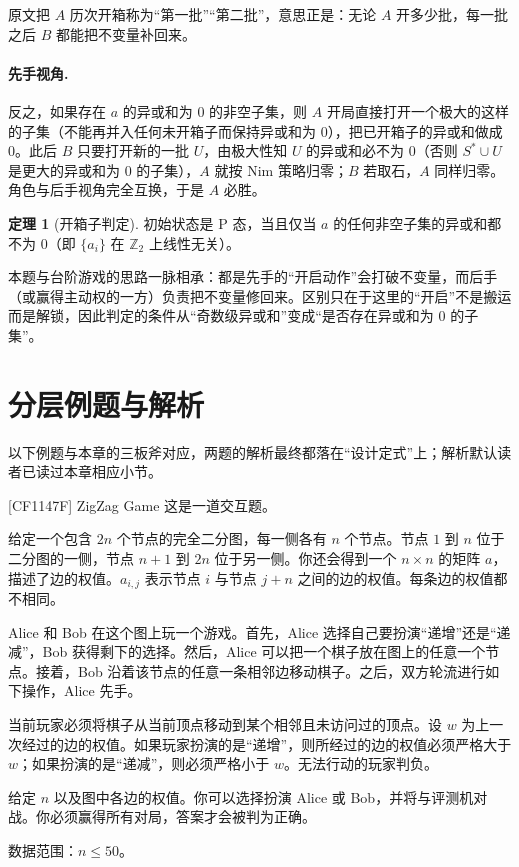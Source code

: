 \documentclass[UTF8,a4paper,11pt,oneside,openany,fontset=fandol]{ctexbook}
\theoremstyle{definition}
\newtheorem{theorem}[definition]{定理}
\newcommand{\Z}{\mathbb Z}
\begin{document}
原文把 $A$ 历次开箱称为“第一批”“第二批”，意思正是：无论 $A$ 开多少批，每一批之后 $B$ 都能把不变量补回来。

\paragraph{先手视角.} 反之，如果存在 $a$ 的异或和为 $0$ 的非空子集，则 $A$ 开局直接打开一个极大的这样的子集（不能再并入任何未开箱子而保持异或和为 $0$），把已开箱子的异或和做成 $0$。此后 $B$ 只要打开新的一批 $U$，由极大性知 $U$ 的异或和必不为 $0$（否则 $S^*\cup U$ 是更大的异或和为 $0$ 的子集），$A$ 就按 Nim 策略归零；$B$ 若取石，$A$ 同样归零。角色与后手视角完全互换，于是 $A$ 必胜。

\begin{theorem}[开箱子判定]\label{thm:boxnim}
初始状态是 P 态，当且仅当 $a$ 的任何非空子集的异或和都不为 $0$（即 $\{a_i\}$ 在 $\Z_2$ 上线性无关）。
\end{theorem}

本题与台阶游戏的思路一脉相承：都是先手的“开启动作”会打破不变量，而后手（或赢得主动权的一方）负责把不变量修回来。区别只在于这里的“开启”不是搬运而是解锁，因此判定的条件从“奇数级异或和”变成“是否存在异或和为 $0$ 的子集”。

\section{分层例题与解析}

以下例题与本章的三板斧对应，两题的解析最终都落在“设计定式”上；解析默认读者已读过本章相应小节。

\begin{problem}{[CF1147F] ZigZag Game}
这是一道交互题。

给定一个包含 $2n$ 个节点的完全二分图，每一侧各有 $n$ 个节点。节点 $1$ 到 $n$ 位于二分图的一侧，节点 $n+1$ 到 $2n$ 位于另一侧。你还会得到一个 $n\times n$ 的矩阵 $a$，描述了边的权值。$a_{i,j}$ 表示节点 $i$ 与节点 $j+n$ 之间的边的权值。每条边的权值都不相同。

Alice 和 Bob 在这个图上玩一个游戏。首先，Alice 选择自己要扮演“递增”还是“递减”，Bob 获得剩下的选择。然后，Alice 可以把一个棋子放在图上的任意一个节点。接着，Bob 沿着该节点的任意一条相邻边移动棋子。之后，双方轮流进行如下操作，Alice 先手。

当前玩家必须将棋子从当前顶点移动到某个相邻且未访问过的顶点。设 $w$ 为上一次经过的边的权值。如果玩家扮演的是“递增”，则所经过的边的权值必须严格大于 $w$；如果扮演的是“递减”，则必须严格小于 $w$。无法行动的玩家判负。

给定 $n$ 以及图中各边的权值。你可以选择扮演 Alice 或 Bob，并将与评测机对战。你必须赢得所有对局，答案才会被判为正确。

数据范围：$n\le50$。
\end{problem}
\end{document}
